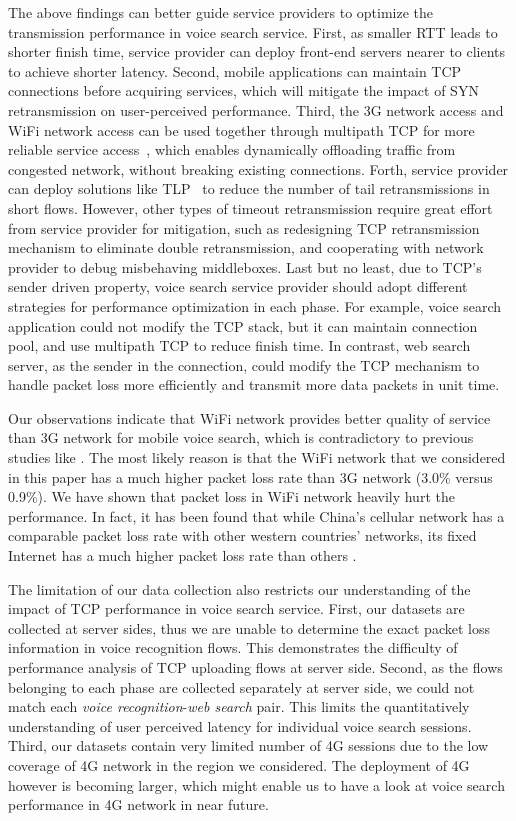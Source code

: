 The above findings can better guide service providers to optimize the transmission performance in voice search service. First, as smaller RTT leads to shorter finish time, service provider can deploy front-end servers nearer to clients to achieve shorter latency. Second, mobile applications can maintain TCP connections before acquiring services, which will mitigate the impact of SYN retransmission on user-perceived performance. Third, the 3G network access and WiFi network access can be used together through multipath TCP for more reliable service access~\cite{UM-CS-2012-022,Chen:2013:MSM:2504730.2504751}, which enables dynamically offloading traffic from congested network, without breaking existing connections. Forth, service provider can deploy solutions like TLP~\cite{flach2013reducing} to reduce the number of tail retransmissions in short flows. However, other types of timeout retransmission require great effort from service provider for mitigation, such as redesigning TCP retransmission mechanism to eliminate double retransmission, and cooperating with network provider to debug misbehaving middleboxes. Last but no least, due to TCP's sender driven property, voice search service provider should adopt different strategies for performance optimization in each phase. For example, voice search application could not modify the TCP stack, but it can maintain connection pool, and use multipath TCP to reduce finish time. In contrast, web search server, as the sender in the connection, could modify the TCP mechanism to handle packet loss more efficiently and transmit more data packets in unit time.

Our observations indicate that WiFi network provides better quality of service than 3G network for mobile voice search, which is contradictory to previous studies like \cite{sommers2012cell}. The most likely reason is that the WiFi network that we considered in this paper has a much higher packet loss rate than 3G network (3.0\% versus 0.9\%). We have shown that packet loss in WiFi network heavily hurt the performance. In fact, it has been found that while China's cellular network has a comparable packet loss rate with other western countries' networks, its fixed Internet has a much higher packet loss rate than others \cite{HeikkinenB12}.

The limitation of our data collection also restricts our understanding of the impact of TCP performance in voice search service. First, our datasets are collected at server sides, thus we are unable to determine the exact packet loss information in voice recognition flows. This demonstrates the difficulty of performance analysis of TCP uploading flows at server side. Second, as the flows belonging to each phase are collected separately at server side, we could not match each \emph{voice recognition}-\emph{web search} pair. This limits the quantitatively understanding of user perceived latency for individual voice search sessions. Third, our datasets contain very limited number of 4G sessions due to the low coverage of 4G network in the region we considered. The deployment of 4G however is becoming larger, which might enable us to have a look at voice search performance in 4G network in near future.

